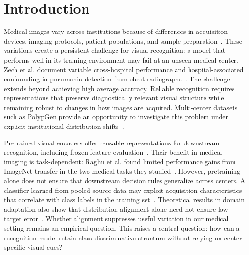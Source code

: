\section{Introduction}
\label{sec:introduction}

Medical images vary across institutions because of differences in acquisition devices, imaging protocols, patient populations, and sample preparation~\cite{ali2023polypgen}. These variations create a persistent challenge for visual recognition: a model that performs well in its training environment may fail at an unseen medical center. Zech et al. document variable cross-hospital performance and hospital-associated confounding in pneumonia detection from chest radiographs~\cite{zech2018generalization}. The challenge extends beyond achieving high average accuracy. Reliable recognition requires representations that preserve diagnostically relevant visual structure while remaining robust to changes in how images are acquired. Multi-center datasets such as PolypGen provide an opportunity to investigate this problem under explicit institutional distribution shifts~\cite{ali2023polypgen}.

Pretrained visual encoders offer reusable representations for downstream recognition, including frozen-feature evaluation~\cite{oquab2024dinov2}. Their benefit in medical imaging is task-dependent: Raghu et al. found limited performance gains from ImageNet transfer in the two medical tasks they studied~\cite{raghu2019transfusion}. However, pretraining alone does not ensure that downstream decision rules generalize across centers. A classifier learned from pooled source data may exploit acquisition characteristics that correlate with class labels in the training set~\cite{zech2018generalization}. Theoretical results in domain adaptation also show that distribution alignment alone need not ensure low target error~\cite{zhao2019invariant}. Whether alignment suppresses useful variation in our medical setting remains an empirical question. This raises a central question: how can a recognition model retain class-discriminative structure without relying on center-specific visual cues?

